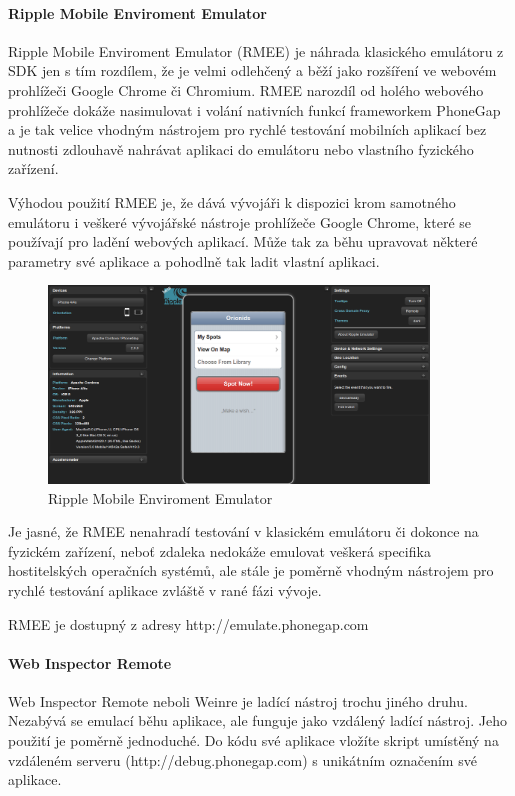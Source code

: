 \paragraph{Ripple Mobile Enviroment Emulator}
Ripple Mobile Enviroment Emulator (RMEE) je náhrada klasického emulátoru z SDK jen s tím rozdílem, že je velmi odlehčený a běží jako rozšíření ve webovém prohlížeči Google Chrome či Chromium. RMEE narozdíl od holého webového prohlížeče dokáže nasimulovat i volání nativních funkcí frameworkem PhoneGap a je tak velice vhodným nástrojem pro rychlé testování mobilních aplikací bez nutnosti zdlouhavě nahrávat aplikaci do emulátoru nebo vlastního fyzického zařízení.

Výhodou použití RMEE je, že dává vývojáři k dispozici krom samotného emulátoru i veškeré vývojářské nástroje prohlížeče Google Chrome, které se používají pro ladění webových aplikací. Může tak za běhu upravovat některé parametry své aplikace a pohodlně tak ladit vlastní aplikaci.

\begin{figure}\centering
\includegraphics[width=0.9\textwidth]{RMEE.png}
\caption{Ripple Mobile Enviroment Emulator}
\label{fig:RMEE}
\end{figure} 

Je jasné, že RMEE nenahradí testování v klasickém emulátoru či dokonce na fyzickém zařízení, neboť zdaleka nedokáže emulovat veškerá specifika hostitelských operačních systémů, ale stále je poměrně vhodným nástrojem pro rychlé testování aplikace zvláště v rané fázi vývoje.

RMEE je dostupný z adresy http://emulate.phonegap.com

\paragraph{Web Inspector Remote}
Web Inspector Remote neboli Weinre je ladící nástroj trochu jiného druhu. Nezabývá se emulací běhu aplikace, ale funguje jako vzdálený ladící nástroj. Jeho použití je poměrně jednoduché. Do kódu své aplikace vložíte skript umístěný na vzdáleném serveru (http://debug.phonegap.com) s unikátním označením své aplikace.

